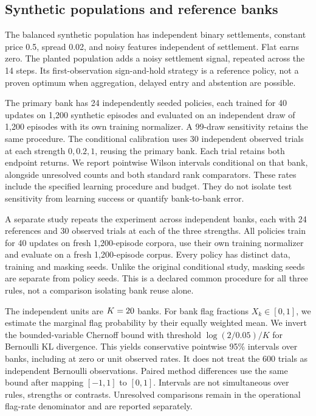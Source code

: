 \documentclass[10pt,twocolumn]{article}
\begin{document}
\subsection{Synthetic populations and reference banks}
The balanced synthetic population has independent binary settlements, constant
price 0.5, spread 0.02, and noisy features independent of settlement. Flat earns
zero. The planted population adds a noisy settlement signal, repeated across
the 14 steps. Its first-observation sign-and-hold strategy is a reference
policy, not a proven optimum when aggregation, delayed entry and abstention
are possible.

The primary bank has 24 independently seeded policies, each trained for 40
updates on 1,200 synthetic episodes and evaluated on an independent draw of
1,200 episodes with its own training normalizer. A 99-draw sensitivity retains
the same procedure. The conditional calibration uses 30 independent observed
trials at each strength $0,0.2,1$, reusing the primary bank. Each trial retains
both endpoint returns. We report pointwise Wilson intervals conditional on
that bank, alongside unresolved counts and both standard rank comparators.
These rates include the specified learning procedure and budget. They do not
isolate test sensitivity from learning success or quantify bank-to-bank error.

A separate study repeats the experiment across \BankCount{} independent banks,
each with 24 references and 30 observed trials at each of the three strengths.
All policies train for 40 updates on fresh 1,200-episode corpora, use their own
training normalizer and evaluate on a fresh 1,200-episode corpus. Every policy
has distinct data, training and masking seeds. Unlike the original conditional
study, masking seeds are separate from policy seeds. This is a declared common
procedure for all three rules, not a comparison isolating bank reuse alone.

The independent units are $K=20$ banks. For bank flag fractions
$X_k\in[0,1]$, we estimate the marginal flag probability by their equally weighted mean. We
invert the bounded-variable Chernoff bound \citep{hoeffding1963} with threshold
$\log(2/0.05)/K$ for Bernoulli KL divergence. This yields conservative pointwise
95\% intervals over banks, including at zero or unit observed rates. It does
not treat the 600 trials as independent Bernoulli observations. Paired method
differences use the same bound after mapping $[-1,1]$ to $[0,1]$. Intervals are
not simultaneous over rules, strengths or contrasts. Unresolved comparisons
remain in the operational flag-rate denominator and are reported separately.
\end{document}
